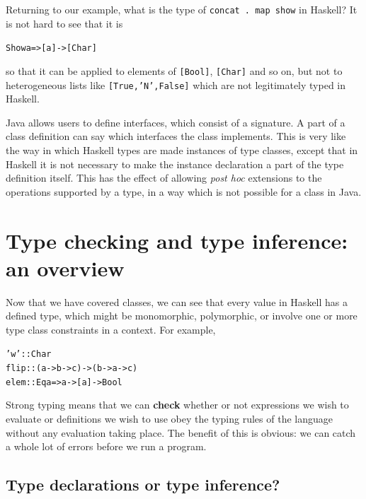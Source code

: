 {\medskip
Returning to our example, what is the type of \texttt{concat .\ map show} in Haskell? 
It is not hard to see that it is
\begin{alltt}
Show a => [a] -> [Char]
\end{alltt}
so that it can be applied to elements of \texttt{[Bool]}, \texttt{[Char]} and so on,
but not to hetero\-geneous lists like \texttt{[True,'N',False]} which are
not legitimately typed in Haskell.

\medskip
Java allows users to define interfaces, which consist of a signature.
A part of a class definition can say which interfaces the class
implements. This is very like the way in which Haskell types are made
instances of type classes, except that in Haskell it is not necessary to
make the instance declaration a part of the type definition itself. This
has the effect of allowing {\em post hoc\/} extensions to the operations
supported by a type, in a way which is not possible for a class in Java.}



\section{Type checking and type inference: an overview}

Now that we have covered classes, we can see that every value in Haskell has a defined type, 
which might be monomorphic, polymorphic, or involve one or more type class 
constraints in a context. For example,
\begin{alltt}
'w'   :: Char
flip  :: (a -> b -> c) -> (b -> a -> c)
elem  :: Eq a => a -> [a] -> Bool
\end{alltt}
Strong typing means that we can \textbf{check} whether or
not expressions we
wish to
evaluate or definitions we wish to use obey the typing rules of the
language without any evaluation taking place. The benefit of this is
obvious: we can catch a whole lot of errors before we run a program.



\subsection*{Type declarations or type inference?}

